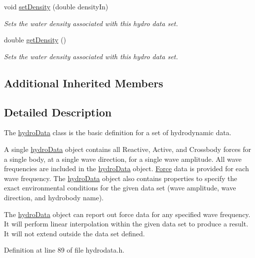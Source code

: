 \begin{DoxyCompactItemize}
void \hyperlink{classosea_1_1ofreq_1_1hydro_data_af424ccf2c3d7519c5644130d686114bc}{set\-Density} (double density\-In)
\begin{DoxyCompactList}\small\item\em Sets the water density associated with this hydro data set. \end{DoxyCompactList}\item 
double \hyperlink{classosea_1_1ofreq_1_1hydro_data_a3dc47c3b8baa68398d8c84dcf40ca7a5}{get\-Density} ()
\begin{DoxyCompactList}\small\item\em Sets the water density associated with this hydro data set. \end{DoxyCompactList}\end{DoxyCompactItemize}
\subsection*{Additional Inherited Members}


\subsection{Detailed Description}
The \hyperlink{classosea_1_1ofreq_1_1hydro_data}{hydro\-Data} class is the basic definition for a set of hydrodynamic data. 

A single \hyperlink{classosea_1_1ofreq_1_1hydro_data}{hydro\-Data} object contains all Reactive, Active, and Crossbody forces for a single body, at a single wave direction, for a single wave amplitude. All wave frequencies are included in the \hyperlink{classosea_1_1ofreq_1_1hydro_data}{hydro\-Data} object. \hyperlink{classosea_1_1ofreq_1_1_force}{Force} data is provided for each wave frequency. The \hyperlink{classosea_1_1ofreq_1_1hydro_data}{hydro\-Data} object also contains properties to specify the exact environmental conditions for the given data set (wave amplitude, wave direction, and hydrobody name).

The \hyperlink{classosea_1_1ofreq_1_1hydro_data}{hydro\-Data} object can report out force data for any specified wave frequency. It will perform linear interpolation within the given data set to produce a result. It will not extend outside the data set defined. 

Definition at line 89 of file hydrodata.\-h.



